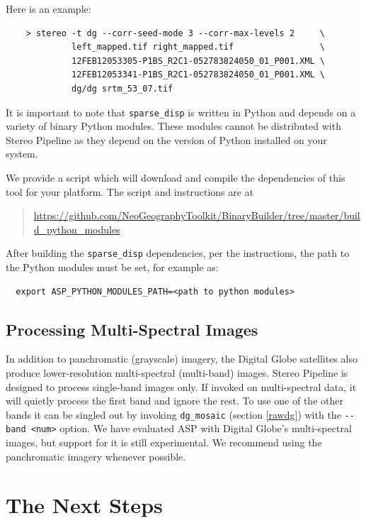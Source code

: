 Here is an example:

\begin{verbatim}
    > stereo -t dg --corr-seed-mode 3 --corr-max-levels 2     \
             left_mapped.tif right_mapped.tif                 \
             12FEB12053305-P1BS_R2C1-052783824050_01_P001.XML \
             12FEB12053341-P1BS_R2C1-052783824050_01_P001.XML \
             dg/dg srtm_53_07.tif
\end{verbatim}

It is important to note that \texttt{sparse\_disp} is written in Python
and depends on a variety of binary Python modules. These modules cannot
be distributed with Stereo Pipeline as they depend on the version of
Python installed on your system.

We provide a script which will download and compile the dependencies of
this tool for your platform. The script and instructions are at

\begin{quote}
\indent \href{https://github.com/NeoGeographyToolkit/BinaryBuilder/tree/master/build\_python\_modules}{https://github.com/NeoGeographyToolkit/BinaryBuilder/tree/master/build\_python\_modules}
\end{quote}

After building the \texttt{sparse\_disp} dependencies, per the instructions, the path
to the Python modules must be set, for example as:
\begin{verbatim}
  export ASP_PYTHON_MODULES_PATH=<path to python modules>
\end{verbatim}

\section{Processing Multi-Spectral Images}

In addition to panchromatic (grayscale) imagery, the Digital Globe
satellites also produce lower-resolution multi-spectral (multi-band)
images. Stereo Pipeline is designed to process single-band images
only. If invoked on multi-spectral data, it will quietly process the
first band and ignore the rest. To use one of the other
bands it can be singled out by invoking \texttt{dg\_mosaic}
(section \ref{rawdg}) with the \texttt{-\/-band <num>} option. We have
evaluated ASP with Digital Globe's multi-spectral images, but
support for it is still experimental. We recommend using the
panchromatic imagery whenever possible.

\chapter{The Next Steps}
\label{nextsteps}

